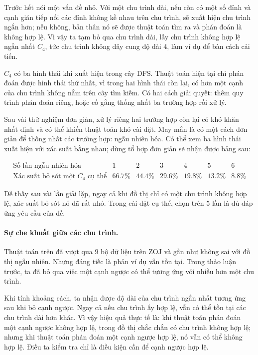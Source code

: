 \documentclass[11pt]{article}
\begin{document}
Trước hết nói một vấn đề nhỏ. Với một chu trình dài, nếu còn có một số đỉnh và
cạnh gián tiếp nối các đỉnh không kề nhau trên chu trình, sẽ xuất hiện chu
trình ngắn hơn; nếu không, bản thân nó sẽ được thuật toán tìm ra và phán đoán
là không hợp lệ. Vì vậy ta tạm bỏ qua chu trình dài, lấy chu trình không hợp
lệ ngắn nhất \(C_4\), tức chu trình không dây cung độ dài \(4\), làm ví dụ để
bàn cách cải tiến.

\(C_4\) có ba hình thái khi xuất hiện trong cây DFS. Thuật toán hiện tại chỉ
phán đoán được hình thái thứ nhất, vì trong hai hình thái còn lại, có hơn một
cạnh của chu trình không nằm trên cây tìm kiếm. Có hai cách giải quyết: thêm
quy trình phán đoán riêng, hoặc cố gắng thống nhất ba trường hợp rồi xử lý.

Sau vài thử nghiệm đơn giản, xử lý riêng hai trường hợp còn lại có khó khăn
nhất định và có thể khiến thuật toán khó cài đặt. May mắn là có một cách đơn
giản để thống nhất các trường hợp: ngẫu nhiên hóa. Có thể xem ba hình thái
xuất hiện với xác suất bằng nhau; dùng tổ hợp đơn giản sẽ nhận được bảng sau:

\[
\begin{array}{c|rrrrrr}
\text{Số lần ngẫu nhiên hóa} & 1 & 2 & 3 & 4 & 5 & 6\\
\hline
\text{Xác suất bỏ sót một }C_4\text{ cụ thể} &
66.7\% & 44.4\% & 29.6\% & 19.8\% & 13.2\% & 8.8\%
\end{array}
\]

Dễ thấy sau vài lần giải lặp, ngay cả khi đồ thị chỉ có một chu trình không
hợp lệ, xác suất bỏ sót nó đã rất nhỏ. Trong cài đặt cụ thể, chọn trên \(5\)
lần là đủ đáp ứng yêu cầu của đề.

\paragraph{Sự che khuất giữa các chu trình.}
Thuật toán trên đã vượt qua \(9\) bộ dữ liệu trên ZOJ và gần như không sai với
đồ thị ngẫu nhiên. Nhưng đáng tiếc là phản ví dụ vẫn tồn tại. Trong thảo luận
trước, ta đã bỏ qua việc một cạnh ngược có thể tương ứng với nhiều hơn một
chu trình.

Khi tính khoảng cách, ta nhận được độ dài của chu trình ngắn nhất tương ứng
sau khi bỏ cạnh ngược. Ngay cả nếu chu trình ấy hợp lệ, vẫn có thể tồn tại
các chu trình dài hơn khác. Vì vậy hiệu quả thực tế là: khi thuật toán phán
đoán một cạnh ngược không hợp lệ, trong đồ thị chắc chắn có chu trình không
hợp lệ; nhưng khi thuật toán phán đoán một cạnh ngược hợp lệ, nó vẫn có thể
không hợp lệ. Điều ta kiểm tra chỉ là điều kiện cần để cạnh ngược hợp lệ.
\end{document}
